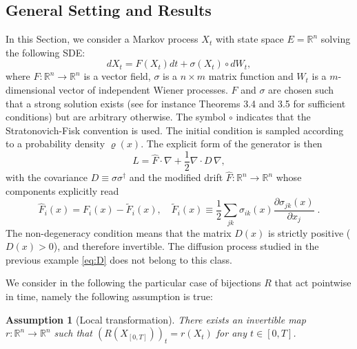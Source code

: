 \documentclass[a4paper,11pt]{article}
\numberwithin{equation}{section}
\newtheorem{assumption}[theorem]{Assumption}
\begin{document}
\subsection{General Setting and Results}
In this Section, we consider a Markov process $X_{t}$ with state space $E= \mathbb{R}^n$ solving the following SDE:
\begin{equation}\label{eq:diff}
dX_{t}=F(X_{t})dt+ \sigma(X_{t})\circ dW_t,
\end{equation}
where $F: \mathbb{R}^n \to \mathbb{R}^n$ is a vector field, $\sigma$ is a $n\times m$ matrix function and $W_t$ is a $m$-dimensional vector of independent Wiener processes. $F$ and $\sigma$ are chosen such that a strong solution exists (see for instance \cite{Kha12} Theorems 3.4 and 3.5 for sufficient conditions) but are arbitrary otherwise. The symbol $\circ$ indicates that the Stratonovich-Fisk convention \cite{Fis63,Str68} is used. The initial condition is sampled according to a probability density $\varrho(x)$. The explicit form of the generator is then 
\begin{equation}
L=\widehat{F} \cdot \nabla+\frac{1}{2}\nabla \cdot D \, \nabla,\label{eq:gpd}
\end{equation}
with the covariance $D \equiv \sigma \sigma^\dag$ and the modified drift $\widehat{F}: \mathbb{R}^n \to \mathbb{R}^n$ whose components explicitly read
\begin{equation}\label{eq:moddrift}
\widehat{F}_i(x)=F_i(x)- \widetilde{F}_i(x), \quad \widetilde{F}_i(x)\equiv \frac{1}{2}\sum_{jk}\sigma_{ik}(x)\frac{\partial \sigma_{jk}(x)}{\partial x_j} \; .
\end{equation}
The non-degeneracy condition means that the matrix $D(x)$ is strictly positive ($D(x)>0$), and therefore invertible. The diffusion process studied in the previous example \eqref{eq:D} does not belong to this class. 


We consider in the following the particular case of bijections $R$ that act pointwise in time, namely the following assumption is true:
\begin{assumption}[Local transformation]\label{ass:local}
 There exists an invertible map $r : \mathbb{R}^n \to \mathbb{R}^n$ such that $\left(R\left(X_{\left[0,T\right]}\right)\right)_{t}=r\left(X_{t}\right)$ for any $t \in [0,T]$.    
\end{assumption}
\end{document}
